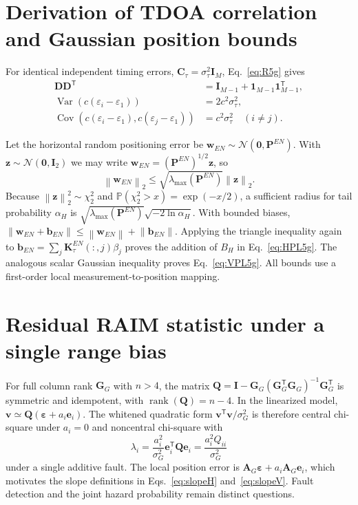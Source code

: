 \documentclass[pdflatex,sn-mathphys-num]{sn-jnl}
\newcommand{\vect}[1]{\boldsymbol{#1}}
\newcommand{\mat}[1]{\mathbf{#1}}
\newcommand{\norm}[1]{\left\lVert #1\right\rVert}
\newcommand{\trans}{^{\mathsf T}}
\newcommand{\prob}{\mathbb{P}}
\begin{document}
\begin{appendices}
\section{Derivation of TDOA correlation and Gaussian position bounds}
\label{app:bounds}

For identical independent timing errors,
$\mat{C}_\tau=\sigma_\tau^2\mat{I}_M$,
Eq.~\eqref{eq:R5g} gives
\begin{align}
 \mat{D}\mat{D}\trans&=
 \mat{I}_{M-1}+\vect{1}_{M-1}\vect{1}_{M-1}\trans,\\
 \operatorname{Var}(c(\varepsilon_i-\varepsilon_1))&=
 2c^2\sigma_\tau^2,\\
 \operatorname{Cov}(c(\varepsilon_i-\varepsilon_1),
 c(\varepsilon_j-\varepsilon_1))&=
 c^2\sigma_\tau^2\quad(i\ne j).
\end{align}

Let the horizontal random positioning error be
$\vect{w}_{EN}\sim\mathcal{N}(\vect{0},\mat{P}^{EN})$.
With $\vect{z}\sim\mathcal{N}(\vect{0},\mat{I}_2)$ we may write
$\vect{w}_{EN}=(\mat{P}^{EN})^{1/2}\vect{z}$, so
\begin{equation}\label{eq:radial-proof}
 \norm{\vect{w}_{EN}}_2\leq
 \sqrt{\lambda_{\max}(\mat{P}^{EN})}\norm{\vect{z}}_2.
\end{equation}
Because $\norm{\vect{z}}_2^2\sim\chi^2_2$ and
$\prob(\chi_2^2>x)=\exp(-x/2)$, a sufficient radius for tail
probability $\alpha_H$ is
$\sqrt{\lambda_{\max}(\mat{P}^{EN})}\sqrt{-2\ln\alpha_H}$.
With bounded biases, $\norm{\vect{w}_{EN}+\vect{b}_{EN}}
\leq\norm{\vect{w}_{EN}}+\norm{\vect{b}_{EN}}$.
Applying the triangle inequality again to
$\vect{b}_{EN}=\sum_j\mat{K}_\tau^{EN}(:,j)\beta_j$
proves the addition of $B_H$ in Eq.~\eqref{eq:HPL5g}.
The analogous scalar Gaussian inequality proves
Eq.~\eqref{eq:VPL5g}. All bounds use a first-order local
measurement-to-position mapping.

\section{Residual RAIM statistic under a single range bias}
\label{app:raim}

For full column rank $\mat{G}_G$ with $n>4$, the matrix
$\mat{Q}=\mat{I}-\mat{G}_G(\mat{G}_G\trans\mat{G}_G)^{-1}
\mat{G}_G\trans$ is symmetric and idempotent, with
$\operatorname{rank}(\mat{Q})=n-4$. In the linearized model,
$\vect{v}\simeq\mat{Q}(\vect{\varepsilon}+a_i\vect{e}_i)$.
The whitened quadratic form
$\vect{v}\trans\vect{v}/\sigma_G^2$ is therefore central
chi-square under $a_i=0$ and noncentral chi-square with
\begin{equation}
 \lambda_i=\frac{a_i^2}{\sigma_G^2}\vect{e}_i\trans
 \mat{Q}\vect{e}_i=\frac{a_i^2 Q_{ii}}{\sigma_G^2}
\end{equation}
under a single additive fault. The local position error is
$\mat{A}_G\vect{\varepsilon}+a_i\mat{A}_G\vect{e}_i$,
which motivates the slope definitions in
Eqs.~\eqref{eq:slopeH} and~\eqref{eq:slopeV}. Fault detection
and the joint hazard probability remain distinct questions.

\end{appendices}
\end{document}
